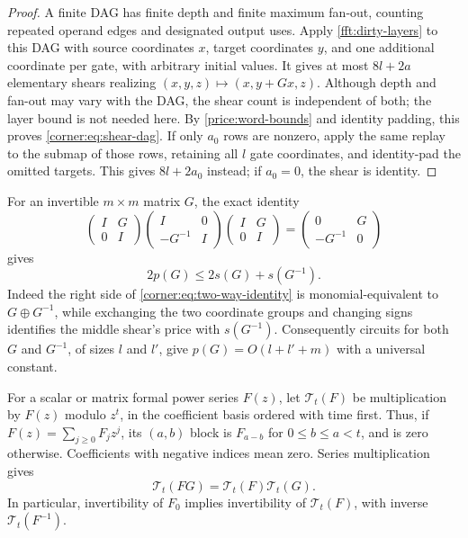 \begin{proof}
A finite DAG has finite depth and finite maximum fan-out, counting
repeated operand edges and designated output uses.  Apply
\cref{fft:dirty-layers} to this DAG with source coordinates $x$,
target coordinates $y$, and one additional coordinate per gate,
with arbitrary initial values.  It gives at most $8l+2a$ elementary
shears realizing $(x,y,z)\mapsto(x,y+Gx,z)$.
Although depth and fan-out may vary with the DAG, the shear count is
independent of both; the layer bound is not needed here.
By \cref{price:word-bounds} and identity padding, this proves
\cref{corner:eq:shear-dag}.  If only $a_0$ rows are nonzero, apply the
same replay to the submap of those rows, retaining all $l$ gate
coordinates, and identity-pad the omitted targets.  This gives
$8l+2a_0$ instead; if $a_0=0$, the shear is identity.
\end{proof}

For an invertible $m\times m$ matrix $G$, the exact identity
\begin{equation}
 \begin{pmatrix}I&G\\0&I\end{pmatrix}
 \begin{pmatrix}I&0\\-G^{-1}&I\end{pmatrix}
 \begin{pmatrix}I&G\\0&I\end{pmatrix}
 =\begin{pmatrix}0&G\\-G^{-1}&0\end{pmatrix}
 \label{corner:eq:two-way-identity}
\end{equation}
gives
\begin{equation}
 2p(G)\le 2s(G)+s(G^{-1}).
 \label{corner:eq:two-way-bound}
\end{equation}
Indeed the right side of \cref{corner:eq:two-way-identity} is
monomial-equivalent to $G\oplus G^{-1}$, while exchanging the two
coordinate groups and changing signs identifies the middle shear's
price with $s(G^{-1})$.  Consequently circuits for both $G$ and
$G^{-1}$, of sizes $l$ and $l'$, give
$p(G)=O(l+l'+m)$ with a universal constant.

For a scalar or matrix formal power series $F(z)$, let
$\mathcal T_t(F)$ be multiplication by $F(z)$ modulo $z^t$, in the
coefficient basis ordered with time first.  Thus, if
$F(z)=\sum_{j\ge0}F_jz^j$, its $(a,b)$ block is $F_{a-b}$ for
$0\le b\le a<t$, and is zero otherwise.  Coefficients with negative
indices mean zero.  Series multiplication gives
\begin{equation}
 \mathcal T_t(FG)=\mathcal T_t(F)\mathcal T_t(G).
 \label{corner:eq:truncation-product}
\end{equation}
In particular, invertibility of $F_0$ implies invertibility of
$\mathcal T_t(F)$, with inverse $\mathcal T_t(F^{-1})$.

